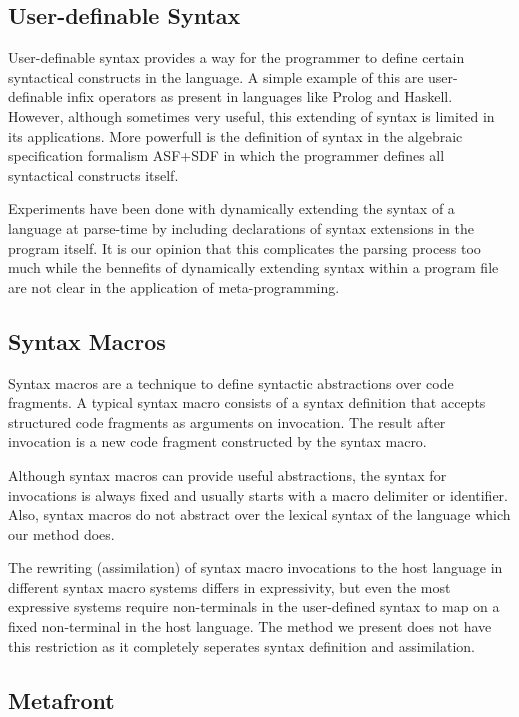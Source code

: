 \documentclass[a4paper,11pt]{article}
\begin{document}
\subsection{User-definable Syntax}

User-definable syntax provides a way for the programmer to define certain
syntactical constructs in the language. A simple example of this are
user-definable infix operators as present in languages like Prolog and
Haskell. However, although sometimes very useful, this extending of syntax
is limited in its applications. More powerfull is the definition of syntax
in the algebraic specification formalism ASF+SDF in which the programmer
defines all syntactical constructs itself.

Experiments have been done with dynamically extending the syntax of a
language at parse-time by including declarations of syntax extensions in
the program itself. It is our opinion that this complicates the parsing
process too much while the bennefits of dynamically extending syntax within
a program file are not clear in the application of meta-programming.


\subsection{Syntax Macros}

Syntax macros are a technique to define syntactic abstractions over code
fragments. A typical syntax macro consists of a syntax definition that
accepts structured code fragments as arguments on invocation. The result
after invocation is a new code fragment constructed by the syntax macro.

Although syntax macros can provide useful abstractions, the syntax for
invocations is always fixed and usually starts with a macro delimiter or
identifier. Also, syntax macros do not abstract over the lexical syntax
of the language which our method does.

The rewriting (assimilation) of syntax macro invocations to the host
language in different syntax macro systems differs in expressivity, but
even the most expressive systems require non-terminals in the user-defined
syntax to map on a fixed non-terminal in the host language. The method
we present does not have this restriction as it completely seperates syntax
definition and assimilation.


\subsection{Metafront}
\end{document}
